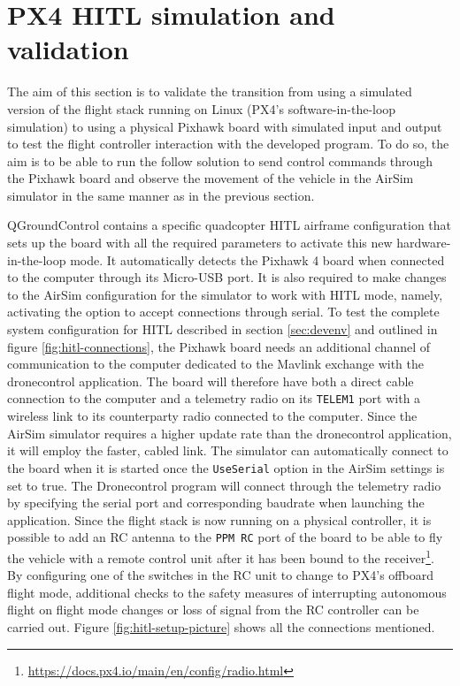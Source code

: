 \section{PX4 HITL simulation and validation}
\label{sec:test-4-hitl}


The aim of this section is to validate the transition from using a simulated version of the flight stack running on Linux (PX4's software-in-the-loop simulation) to using a physical Pixhawk board with simulated input and output to test the flight controller interaction with the developed program.
To do so, the aim is to be able to run the follow solution to send control commands through the Pixhawk board and observe the movement of the vehicle in the AirSim simulator in the same manner as in the previous section.


QGroundControl contains a specific quadcopter HITL airframe configuration that sets up the board with all the required parameters to activate this new hardware-in-the-loop mode.
It automatically detects the Pixhawk 4 board when connected to the computer through its Micro-USB port.
It is also required to make changes to the AirSim configuration for the simulator to work with HITL mode, namely, activating the option to accept connections through serial.
To test the complete system configuration for HITL described in section \ref{sec:devenv} and outlined in figure \ref{fig:hitl-connections}, the Pixhawk board needs an additional channel of communication to the computer dedicated to the Mavlink exchange with the dronecontrol application.
The board will therefore have both a direct cable connection to the computer and a telemetry radio on its \texttt{TELEM1} port with a wireless link to its counterparty radio connected to the computer.
Since the AirSim simulator requires a higher update rate than the dronecontrol application, it will employ the faster, cabled link.
The simulator can automatically connect to the board when it is started once the \texttt{UseSerial} option in the AirSim settings is set to true.
The Dronecontrol program will connect through the telemetry radio by specifying the serial port and corresponding baudrate when launching the application.
Since the flight stack is now running on a physical controller, it is possible to add an RC antenna to the \texttt{PPM RC} port of the board to be able to fly the vehicle with a remote control unit after it has been bound to the receiver\footnote{\url{https://docs.px4.io/main/en/config/radio.html}}.
By configuring one of the switches in the RC unit to change to PX4's offboard flight mode, additional checks to the safety measures of interrupting autonomous flight on flight mode changes or loss of signal from the RC controller can be carried out.
Figure \ref{fig:hitl-setup-picture} shows all the connections mentioned.

